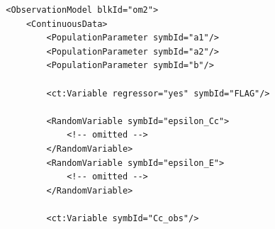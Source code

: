 \lstset{language=XML}
\begin{lstlisting}
        <ObservationModel blkId="om2">
            <ContinuousData>
                <PopulationParameter symbId="a1"/>
                <PopulationParameter symbId="a2"/>
                <PopulationParameter symbId="b"/>
                
                <ct:Variable regressor="yes" symbId="FLAG"/>

                <RandomVariable symbId="epsilon_Cc">
                    <!-- omitted -->
                </RandomVariable>
                <RandomVariable symbId="epsilon_E">
                    <!-- omitted -->
                </RandomVariable>
                
                <ct:Variable symbId="Cc_obs"/>
                

\end{lstlisting}
